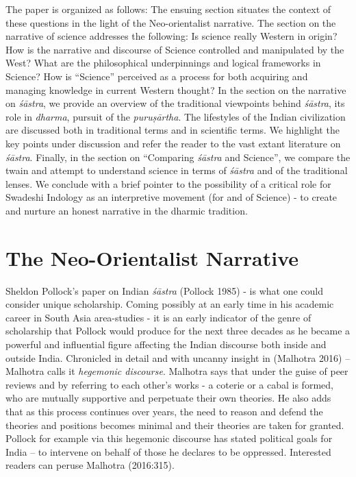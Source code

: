 The paper is organized as follows: The ensuing section situates the context of these questions in the light of the Neo-orientalist narrative. The section on the narrative of science addresses the following: Is science really Western in origin? How is the narrative and discourse of Science controlled and manipulated by the West? What are the philosophical underpinnings and logical frameworks in Science? How is “Science” perceived as a process for both acquiring and managing knowledge in current Western thought? In the section on the narrative on \textit{śāstra}, we provide an overview of the traditional viewpoints behind \textit{śāstra}, its role in \textit{dharma}, pursuit of the \textit{puruṣārtha}. The lifestyles of the Indian civilization are discussed both in traditional terms and in scientific terms. We highlight the key points under discussion and refer the reader to the vast extant literature on \textit{śāstra}. Finally, in the section on “Comparing \textit{śāstra} and Science”, we compare the twain and attempt to understand science in terms of \textit{śāstra} and of the traditional lenses. We conclude with a brief pointer to the possibility of a critical role for Swadeshi Indology as an interpretive movement (for and of Science) - to create and nurture an honest narrative in the dharmic tradition.


\section*{The Neo-Orientalist Narrative}

Sheldon Pollock’s paper on Indian \textit{śāstra} (Pollock 1985) - is what one could consider unique scholarship. Coming possibly at an early time in his academic career in South Asia area-studies - it is an early indicator of the genre of scholarship that Pollock would produce for the next three decades as he became a powerful and influential figure affecting the Indian discourse both inside and outside India. Chronicled in detail and with uncanny insight in (Malhotra 2016) – Malhotra calls it \textit{hegemonic discourse}. Malhotra says that under the guise of peer reviews and by referring to each other’s works - a coterie or a cabal is formed, who are mutually supportive and perpetuate their own theories. He also adds that as this process continues over years, the need to reason and defend the theories and positions becomes minimal and their theories are taken for granted. Pollock for example via this hegemonic discourse has stated political goals for India – to intervene on behalf of those he declares to be oppressed. Interested readers can peruse Malhotra (2016:315).

